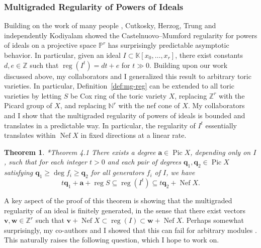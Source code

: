 \documentclass[11pt,reqno]{amsart}
\newtheorem{theorem}[lemma]{Theorem}
\theoremstyle{remark}
\newcommand{\reg}{\operatorname{reg}}
\newcommand{\Pic}{\operatorname{Pic}}
\newcommand{\Nef}{\operatorname{Nef}}
\renewcommand{\aa}{\mathbf a}
\newcommand{\vv}{\mathbf v}
\newcommand{\ww}{\mathbf w}
\newcommand{\qq}{\mathbf q}
\newcommand{\K}{\mathbb{K}}
\newcommand{\N}{\mathbb{N}}
\renewcommand{\P}{\mathbb{P}}
\newcommand{\Z}{\mathbb{Z}}
\newcommand{\juliette}[1]{{\color{red} \sf $\spadesuit\spadesuit\spadesuit$ Juliette: [#1]}}
\begin{document}
\subsubsection{Multigraded Regularity of Powers of Ideals}

Building on the work of many people \cite{bertramEinLazarsfeld91,chandler97}, Cutkosky, Herzog, Trung \cite{cutkoskyHerzogTrung99} and independently Kodiyalam \cite{kodiyalam00} showed the Castelnuovo--Mumford regularity for powers of ideals on a projective space $\P^r$ has surprisingly predictable asymptotic behavior. In particular, given an ideal $I\subset \K[x_0,\ldots,x_r]$, there exist constants $d,e\in\Z$ such that $\reg\!\left(I^t\right) = dt+e$ for $t\gg0$. Building upon our work discussed above, my collaborators and I generalized this result to arbitrary toric varieties. In particular, Definition~\ref{def:mg-reg} can be extended to all toric varieties by letting $S$ be Cox ring of the toric variety $X$, replacing $\Z^r$ with the Picard group of $X$, and replacing $\N^{r}$ with the nef cone of $X$. My collaborators and I show that the multigraded regularity of powers of ideals is bounded and translates in a predictable way. In particular, the regularity of $I^{t}$ essentially translates within $\Nef X$ in fixed directions at a linear rate.


 

\begin{theorem}\cite{bruceHellerSayrafi22}*{Theorem 4.1}
  There exists a degree $\aa\in\Pic X$, depending only on $I$, such that for each integer $t>0$ and each pair of degrees $\qq_1,\qq_2\in\Pic X$ satisfying $\qq_1\geq\deg f_i\geq\qq_2$ for all generators $f_i$ of $I$, we have
	\[ t\qq_1+\aa+\reg S \subseteq \reg\!\left(I^t\right) \subseteq t\qq_2+\Nef X. \]
\end{theorem}

A key aspect of the proof of this theorem is showing that the multigraded regularity of an ideal is finitely generated, in the sense that there exist vectors $\vv,\ww\in \Z^r$ such that $\vv+\Nef X \subset \reg(I) \subset \ww + \Nef X$. Perhaps somewhat surprisingly, my co-authors and I showed that this can fail for arbitrary modules \cite{bruceHellerSayrafi22}. This naturally raises the following question, which I hope to work on. 
\end{document}

